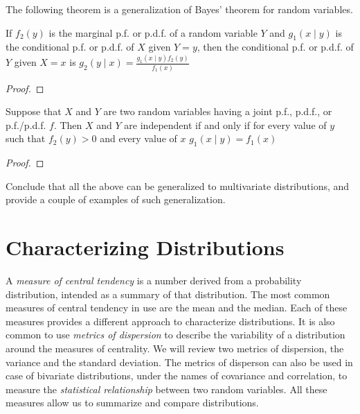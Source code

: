 {\color{red} The following theorem is a generalization of Bayes' theorem for random variables.}

\begin{theorem}
If $f_{2}\left(y\right)$ is the marginal p.f. or p.d.f. of a random variable $Y$ and $g_{1}\left(x\mid y\right)$ is the conditional p.f. or p.d.f. of $X$ given $Y=y$, then the conditional p.f. or p.d.f. of $Y$ given $X=x$ is $g_{2}\left(y\mid x\right)=\frac{g_{1}\left(x\mid y\right)f_{2}\left(y\right)}{f_{1}\left(x\right)}$
\end{theorem}
\begin{proof}
\end{proof}

\begin{proposition}
Suppose that $X$ and $Y$ are two random variables having a joint p.f., p.d.f., or p.f./p.d.f. $f$. Then $X$ and $Y$ are independent if and only if for every value of $y$ such that $f_{2}\left(y\right)>0$ and every value of $x$ $g_{1}\left(x\mid y\right)=f_{1}\left(x\right)$
\end{proposition}
\begin{proof}
\end{proof}

{\color{red} Conclude that all the above can be generalized to multivariate distributions, and provide a couple of examples of such generalization.}

%
%

\section{Characterizing Distributions}
\label{sec:probability_expectation}

A \emph{measure of central tendency} is a number derived from a probability distribution, intended as a summary of that distribution. The most common measures of central tendency in use are the mean and the median. Each of these measures provides a different approach to characterize distributions. It is also common to use \emph{metrics of dispersion} to describe the variability of a distribution around the measures of centrality. We will review two metrics of dispersion, the variance and the standard deviation. The metrics of disperson can also be used in case of bivariate distributions, under the names of covariance and correlation, to measure the \emph{statistical relationship} between two random variables. All these measures allow us to summarize and compare distributions.


